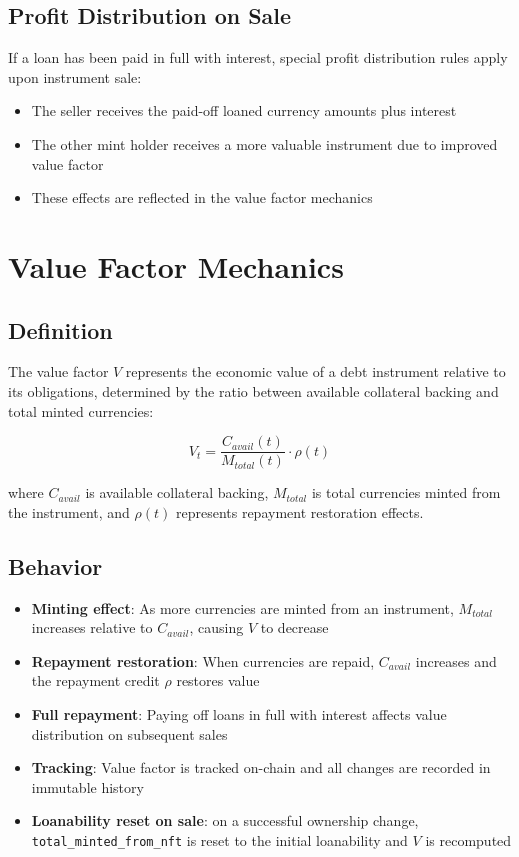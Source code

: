 \documentclass[11pt,a4paper]{article}
\begin{document}
\subsection{Profit Distribution on Sale}
If a loan has been paid in full with interest, special profit distribution rules apply upon instrument sale:
\begin{itemize}
\item The seller receives the paid-off loaned currency amounts plus interest
\item The other mint holder receives a more valuable instrument due to improved value factor
\item These effects are reflected in the value factor mechanics
\end{itemize}

\section{Value Factor Mechanics}
\subsection{Definition}
The value factor $V$ represents the economic value of a debt instrument relative to its obligations, determined by the ratio between available collateral backing and total minted currencies:

\begin{equation}
V_t = \frac{C_{avail}(t)}{M_{total}(t)} \cdot \rho(t)
\end{equation}

where $C_{avail}$ is available collateral backing, $M_{total}$ is total currencies minted from the instrument, and $\rho(t)$ represents repayment restoration effects.

\subsection{Behavior}
\begin{itemize}
\item \textbf{Minting effect}: As more currencies are minted from an instrument, $M_{total}$ increases relative to $C_{avail}$, causing $V$ to decrease
\item \textbf{Repayment restoration}: When currencies are repaid, $C_{avail}$ increases and the repayment credit $\rho$ restores value
\item \textbf{Full repayment}: Paying off loans in full with interest affects value distribution on subsequent sales
\item \textbf{Tracking}: Value factor is tracked on-chain and all changes are recorded in immutable history
\item \textbf{Loanability reset on sale}: on a successful ownership change, \texttt{total\_minted\_from\_nft} is reset to the initial loanability and $V$ is recomputed
\end{itemize}
\end{document}
